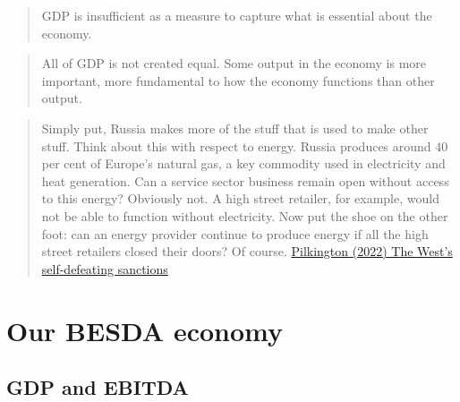 \documentclass[
]{book}
\begin{document}
\begin{quote}
GDP is insufficient as a measure to capture what is essential about the economy.
\end{quote}

\begin{quote}
All of GDP is not created equal. Some output in the economy is more important, more fundamental to how the economy functions than other output.
\end{quote}

\begin{quote}
Simply put, Russia makes more of the stuff that is used to make other stuff. Think about this with respect to energy. Russia produces around 40 per cent of Europe's natural gas, a key commodity used in electricity and heat generation. Can a service sector business remain open without access to this energy? Obviously not. A high street retailer, for example, would not be able to function without electricity. Now put the shoe on the other foot: can an energy provider continue to produce energy if all the high street retailers closed their doors? Of course.
\href{https://thecritic.co.uk/the-wests-self-defeating-sanctions/}{Pilkington (2022) The West's self-defeating sanctions}
\end{quote}

\hypertarget{our-besda-economy}{%
\section{Our BESDA economy}\label{our-besda-economy}}

\hypertarget{gdp-and-ebitda}{%
\subsection{GDP and EBITDA}\label{gdp-and-ebitda}}
\end{document}
